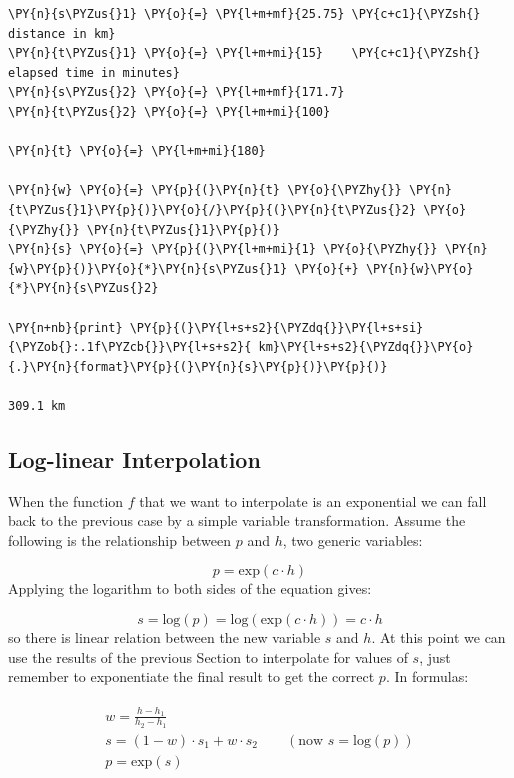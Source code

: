 \begin{codebox}
\begin{Verbatim}[commandchars=\\\{\}]
\PY{n}{s\PYZus{}1} \PY{o}{=} \PY{l+m+mf}{25.75} \PY{c+c1}{\PYZsh{} distance in km}
\PY{n}{t\PYZus{}1} \PY{o}{=} \PY{l+m+mi}{15}    \PY{c+c1}{\PYZsh{} elapsed time in minutes}
\PY{n}{s\PYZus{}2} \PY{o}{=} \PY{l+m+mf}{171.7}
\PY{n}{t\PYZus{}2} \PY{o}{=} \PY{l+m+mi}{100}

\PY{n}{t} \PY{o}{=} \PY{l+m+mi}{180}

\PY{n}{w} \PY{o}{=} \PY{p}{(}\PY{n}{t} \PY{o}{\PYZhy{}} \PY{n}{t\PYZus{}1}\PY{p}{)}\PY{o}{/}\PY{p}{(}\PY{n}{t\PYZus{}2} \PY{o}{\PYZhy{}} \PY{n}{t\PYZus{}1}\PY{p}{)}
\PY{n}{s} \PY{o}{=} \PY{p}{(}\PY{l+m+mi}{1} \PY{o}{\PYZhy{}} \PY{n}{w}\PY{p}{)}\PY{o}{*}\PY{n}{s\PYZus{}1} \PY{o}{+} \PY{n}{w}\PY{o}{*}\PY{n}{s\PYZus{}2}

\PY{n+nb}{print} \PY{p}{(}\PY{l+s+s2}{\PYZdq{}}\PY{l+s+si}{\PYZob{}:.1f\PYZcb{}}\PY{l+s+s2}{ km}\PY{l+s+s2}{\PYZdq{}}\PY{o}{.}\PY{n}{format}\PY{p}{(}\PY{n}{s}\PY{p}{)}\PY{p}{)}

309.1 km
\end{Verbatim}
\end{codebox}

\subsection{Log-linear Interpolation}\label{log-linear-interpolation}
When the function $f$ that we want to interpolate is an exponential we can fall back to the previous case by a simple variable transformation. 
Assume the following is the relationship between $p$ and $h$, two generic variables:

\begin{equation}
p = \mathrm{exp}(c \cdot h)
\end{equation}
Applying the logarithm to both sides of the equation gives:

\begin{equation}
s = \mathrm{log}(p) = \mathrm{log}(\mathrm{exp}(c \cdot h)) = c \cdot h
\end{equation}
so there is linear relation between the new variable $s$ and $h$. At this point we can use the results of the previous Section to interpolate for values of $s$, just remember to exponentiate the final result to get the correct $p$. In formulas:

\begin{align}
\label{eq:log_interp}
\begin{gathered}
w = \frac{h - h_1}{h_2 - h_1} \\
s = (1 - w)\cdot s_1 + w \cdot s_2\qquad (\textrm{now } s = \textrm{log}(p))\\
p = \textrm{exp}(s)
\end{gathered}
\end{align}


